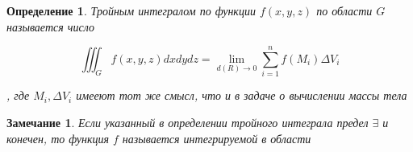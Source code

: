 \documentclass[a4paper, 14pt]{report}
\newtheorem{defenition}{Определение}[chapter]
\newtheorem{note}{Замечание}[chapter]
\begin{document}
    \begin{defenition}
        Тройным интегралом по функции $f(x,y,z)$ по области $G$ называется число 

        $$
        \iiint_G f(x,y,z) dxdydz = \lim_{d(R) \to 0} \sum_{i=1}^n f(M_i) \Delta V_i
        $$

        , где $M_i, \Delta V_i$ имееют тот же смысл, что и в задаче о вычислении массы тела
    \end{defenition}

    \begin{note}
        Если указанный в определении тройного интеграла предел $\exists$ и конечен, то функция $f$ называется интегрируемой в области 
    \end{note}
\end{document}
